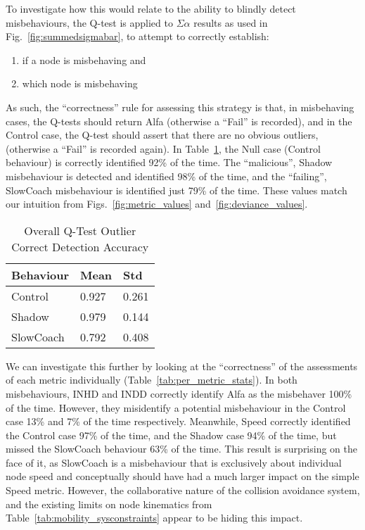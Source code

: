 To investigate how this would relate to the ability to blindly detect misbehaviours, the Q-test is applied to $\Sigma\alpha$ results as used in Fig.~\ref{fig:summedsigmabar}, to attempt to correctly establish:
\begin{enumerate}
  \item if a node is misbehaving and
  \item which node is misbehaving
\end{enumerate}

As such, the ``correctness'' rule for assessing this strategy is that, in misbehaving cases, the Q-tests should return Alfa (otherwise a ``Fail'' is recorded), and in the Control case, the Q-test should assert that there are no obvious outliers, (otherwise a ``Fail'' is recorded again).
In Table~\ref{tab:overall_stats}, the Null case (Control behaviour) is correctly identified 92\% of the time.
The ``malicious'', Shadow misbehaviour is detected and identified 98\% of the time, and the ``failing'', SlowCoach misbehaviour is identified just 79\% of the time. 
These values match our intuition from Figs.~\ref{fig:metric_values} and~\ref{fig:deviance_values}.

\begin{table}
  \caption{Overall Q-Test Outlier Correct Detection Accuracy}
  \centering
\begin{tabular}{lll}
\toprule
Behaviour &  Mean &   Std \\
\midrule
Control   & 0.927 & 0.261 \\
Shadow    & 0.979 & 0.144 \\
SlowCoach & 0.792 & 0.408 \\
\bottomrule
\end{tabular}
  \label{tab:overall_stats}
\end{table}

We can investigate this further by looking at the ``correctness'' of the assessments of each metric individually (Table~\ref{tab:per_metric_stats}).
In both misbehaviours, INHD and INDD correctly identify Alfa as the misbehaver 100\% of the time. 
However, they misidentify a potential misbehaviour in the Control case 13\% and 7\% of the time respectively.
Meanwhile, Speed correctly identified the Control case 97\% of the time, and the Shadow case 94\% of the time, but missed the SlowCoach behaviour 63\% of the time. 
This result is surprising on the face of it, as SlowCoach is a misbehaviour that is exclusively about individual node speed and conceptually should have had a much larger impact on the simple Speed metric.
However, the collaborative nature of the collision avoidance system, and the existing limits on node kinematics from Table~\ref{tab:mobility_sysconstraints} appear to be hiding this impact. 

